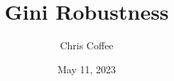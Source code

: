 \documentclass[8pt]{extarticle}
\begin{document}

    \title{Gini Robustness}
    \author{Chris Coffee}
    \date{May 11, 2023}
    \maketitle

%
%
%
%
%
%
\end{document}
